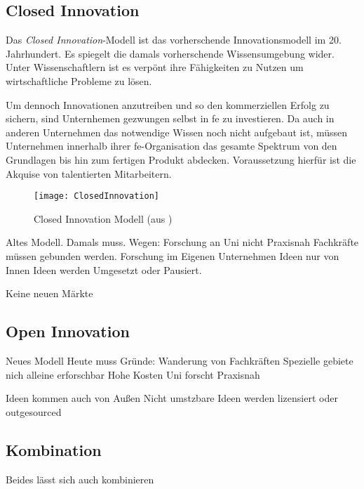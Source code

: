 \subsection{Closed Innovation}\label{sec:grundlagen-closed}

Das \textit{Closed Innovation}-Modell ist das vorherschende Innovationsmodell im 20. Jahrhundert.
Es spiegelt die damals vorherschende Wissensumgebung wider.
Unter Wissenschaftlern ist es verpönt ihre Fähigkeiten zu Nutzen um wirtschaftliche Probleme zu lösen.

Um dennoch Innovationen anzutreiben und so den kommerziellen Erfolg zu sichern,
sind Unternhemen gezwungen selbst in \ac{fe} zu investieren.
Da auch in anderen Unternehmen das notwendige Wissen noch nicht aufgebaut ist,
müssen Unternehmen innerhalb ihrer \ac{fe}-Organisation das gesamte Spektrum von den Grundlagen bis hin zum fertigen Produkt abdecken.
Voraussetzung hierfür ist die Akquise von talentierten Mitarbeitern.


\begin{figure}[ht!]
    \centering
    \texttt{[image: ClosedInnovation]}
    \caption{Closed Innovation Modell (aus \cite[20]{herzog2011})}
    \label{fig:closedInnovation}
\end{figure}

Altes Modell.
Damals muss.
Wegen: Forschung an Uni nicht Praxisnah
Fachkräfte müssen gebunden werden.
Forschung im Eigenen Unternehmen
Ideen nur von Innen
Ideen werden Umgesetzt oder Pausiert.

Keine neuen Märkte

\subsection{Open Innovation}\label{sec:grundlagen-open}

Neues Modell
Heute muss
Gründe: Wanderung von Fachkräften
Spezielle gebiete nich alleine erforschbar
Hohe Kosten
Uni forscht Praxisnah

Ideen kommen auch von Außen
Nicht umstzbare Ideen werden lizensiert oder outgesourced



\subsection{Kombination}\label{sec:grundlagen-kombi}

Beides lässt sich auch kombinieren